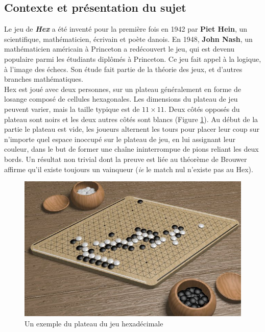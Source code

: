 \documentclass[a4paper,10pt]{article}
\begin{document}
\subsection{Contexte et présentation du sujet}
Le jeu de \textbf{\emph{Hex}} a été inventé pour la première fois en 1942 par \textbf{Piet Hein}, un scientifique, mathématicien, écrivain et poète danois. En 1948, \textbf{John Nash}, un mathématicien américain à Princeton a redécouvert le jeu, qui est devenu populaire parmi les étudiants diplômés à Princeton. Ce jeu fait appel à la logique, à l'image des échecs. Son étude fait partie de la théorie des jeux, et d'autres branches mathématiques.\\

Hex est joué avec deux personnes, sur un plateau généralement en forme de losange composé de cellules hexagonales. Les dimensions du plateau de jeu peuvent varier, mais la taille typique est de $11 \times 11$. Deux côtés opposés du plateau sont noirs et les deux autres côtés sont blancs (Figure \ref{fig:board}). Au début de la partie le plateau est vide, les joueurs alternent les tours pour placer leur coup sur n'importe quel espace inoccupé sur le plateau de jeu, en lui assignant leur couleur, dans le but de former une chaîne ininterrompue de pions reliant les deux bords. Un résultat non trivial dont la preuve est liée au théorème de Brouwer affirme qu'il existe toujours un vainqueur (\emph{ie} le match nul n'existe pas au Hex).\\
\begin{figure}[h]
\begin{center}
    \includegraphics[scale=4.0]{board.jpg}
        \caption{Un exemple du plateau du jeu hexadécimale}
    \label{fig:board}
\end{center}
\end{figure}
\end{document}
